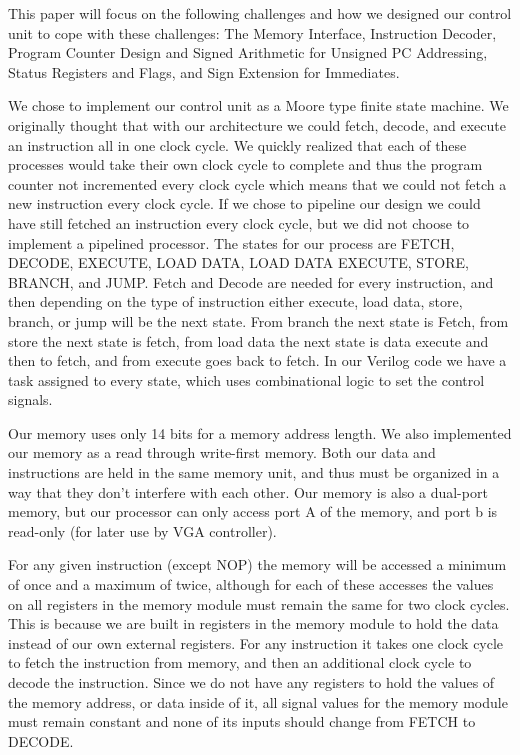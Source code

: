\documentclass[onecolumn, 12pt]{IEEEtran}
\begin{document}
\par
	This paper will focus on the following challenges and how we designed our control unit to cope with these challenges: The Memory Interface, Instruction Decoder, Program Counter Design and Signed Arithmetic for Unsigned PC Addressing, Status Registers and Flags, and Sign Extension for Immediates.
\par
	We chose to implement our control unit as a Moore type finite state machine. We originally thought that with our architecture we could fetch, decode, and execute an instruction all in one clock cycle. We quickly realized that each of these processes would take their own clock cycle to complete and thus the program counter not incremented every clock cycle which means that we could not fetch a new instruction every clock cycle. If we chose to pipeline our design we could have still fetched an instruction every clock cycle, but we did not choose to implement a pipelined processor. The states for our process are FETCH, DECODE, EXECUTE, LOAD DATA, LOAD DATA EXECUTE, STORE, BRANCH, and JUMP. Fetch and Decode are needed for every instruction, and then depending on the type of instruction either execute, load data, store, branch, or jump will be the next state. From branch the next state is Fetch, from store the next state is fetch, from load data the next state is data execute and then to fetch, and from execute goes back to fetch. In our Verilog code we have a task assigned to every state, which uses combinational logic to set the control signals.
\par
	Our memory uses only 14 bits for a memory address length. We also implemented our memory as a read through write-first memory. Both our data and instructions are held in the same memory unit, and thus must be organized in a way that they don't interfere with each other. Our memory is also a dual-port memory, but our processor can only access port A of the memory, and port b is read-only (for later use by VGA controller).
\par
	For any given instruction (except NOP) the memory will be accessed a minimum of once and a maximum of twice, although for each of these accesses the values on all registers in the memory module must remain the same for two clock cycles. This is because we are built in registers in the memory module to hold the data instead of our own external registers. For any instruction it takes one clock cycle to fetch the instruction from memory, and then an additional clock cycle to decode the instruction. Since we do not have any registers to hold the values of the memory address, or data inside of it, all signal values for the memory module must remain constant and none of its inputs should change from FETCH to DECODE.
\end{document}
